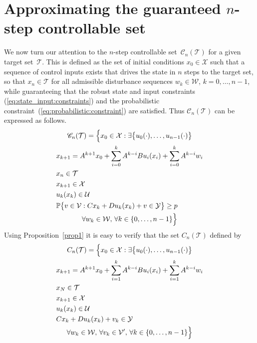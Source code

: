 \documentclass{ifacconf}
\providecommand{\C}{\mathscr C}
\providecommand{\W}{\mathcal W}
\providecommand{\V}{\mathcal V}
\providecommand{\X}{\mathcal X}
\providecommand{\Y}{\mathcal Y}
\providecommand{\U}{\mathcal U}
\providecommand{\T}{\mathcal T}
\providecommand{\PP}{\mathbb P}
\begin{document}
\section{Approximating the guaranteed $n$-step controllable set}\label{ssec:approximating:n:step}
%
We now turn our attention to the $n$-step controllable set~$\C_n(\T)$ for a given target set~$\T$.
%
This is defined as the set of initial conditions $x_0\in\X$ such that a sequence of control inputs exists that drives the state in $n$ steps to the target set, so that $x_n\in\T$ for all admissible disturbance sequences 
$w_k\in\W$, $k=0,\ldots,n-1$, while guaranteeing that the robust state and input constraints 
(\ref{eq:state_input:constraints}) and the probabilistic constraint~(\ref{eq:probabilistic:constraint}) are satisfied.
%
Thus $\C_n(\T)$ can be expressed as follows.
%
\begin{multline*}
\C_n(\T) = \Bigl\{x_0\in\X: \exists \bigl\{u_0(\cdot),\ldots,u_{n-1}(\cdot)\bigr\}\\
\begin{aligned}
&x_{k+1} = A^{k+1} x_0 + \sum_{i=0}^{k} A^{k-i}B u_{i}(x_{i}) + \sum_{i=0}^{k} A^{k-i} w_{i}\\
&x_n\in\T\\
&x_{k+1}\in\X\\
&u_k(x_k)\in\U\\
&\PP\bigl\{v\in\V : Cx_k + Du_k(x_k) +v \in\Y\bigr\}\geq p
\end{aligned}\\
\forall w_k\in\W,\, \forall k\in\{ 0, \ldots , n-1\} \Bigr\}	
\end{multline*}
%
Using Proposition~\ref{prop1} it is easy to verify that the set $C_n(\T)$ defined by
%
\begin{multline*}
C_n(\T) = \Bigl\{ x_0\in\X: \exists \bigl\{u_0(\cdot),\ldots,u_{n-1}(\cdot)\bigr\}\\
\begin{aligned}
&x_{k+1} = A^{k+1} x_0 + \sum_{i=1}^{k} A^{k-i}B u_{i}(x_{i}) + \sum_{i=1}^{k} A^{k-i} w_{i}\\
&x_N\in\T\\
&x_{k+1}\in\X\\
&u_k(x_k)\in\U \\
&Cx_k+Du_k(x_k) + v_k \in\Y
\end{aligned}\\
\forall w_k\in\W,\, \forall v_k\in \V^\prime,\, \forall k\in\{0,\dots,n-1\} \Bigr\}	
\end{multline*}
\end{document}
